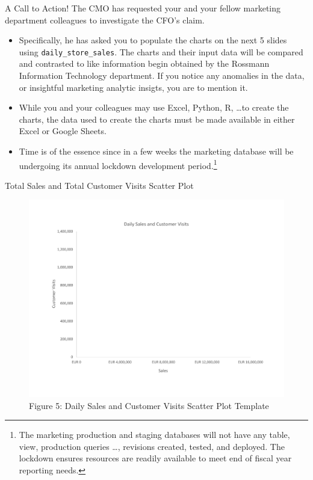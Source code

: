 \documentclass[pdf]{beamer}
\theoremstyle{remark}
\theoremstyle{definition}
\begin{document}
\begin{frame}[t]{A Call to Action!}
The CMO has requested your and your fellow marketing department colleagues to investigate the CFO's claim.  \\
\vspace{0.0ex}
\small
\begin{itemize}
\item Specifically, he has asked you to populate the charts on the next 5 slides using \texttt{daily\_store\_sales}.  The charts and their input data will be compared and contrasted to like information begin obtained by the Rossmann Information Technology department.  If you notice any anomalies in the data, or insightful marketing analytic insigts, you are to mention it.  
\item While you and your colleagues may use Excel, Python, R, \ldots to create the charts, the data used to create the charts must be made available in either Excel or Google Sheets.
\item Time is of the essence since in a few weeks the marketing database will be undergoing its annual lockdown development period.\footnote{The marketing production and staging databases will not have any table, view, production queries \ldots, revisions created, tested, and deployed. The lockdown ensures resources are readily available to meet end of fiscal year reporting needs.} 
\end{itemize} 
\end{frame}

\begin{frame}[t]{Total Sales and Total Customer Visits Scatter Plot}
\begin{figure}[htbp]
    \centering
    \captionsetup{justification=centering}
    \includegraphics[clip, trim=0cm 2.3cm 0cm 2.3cm, width=1.0\textwidth]{Scatter_Plot_Unit_3_Template.pdf}  
    \caption{Figure {\color{franklinblue} 5}: Daily Sales and Customer Visits Scatter Plot Template}
    \label{fig:scatter0}
\end{figure}
\end{frame}
\end{document}
